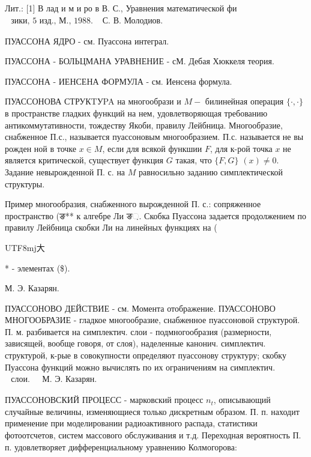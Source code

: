 \documentclass[10pt]{article}
\begin{document}
Лит.: [1] В лад и м и ро в В. С., Уравнения математической фи$\begin{array}{ll}\text { зики, } 5 \text { изд., М., } 1988 . & \text { С. В. Молодиов. }\end{array}$



ПУАССОНА ЯДРО - см. Пуассона интеграл.



ПУАССОНА - БОЛЬЦМАНА УРАВНЕНИЕ - сМ. Дебая Хюккеля теория.



ПУАССОНА - ИЕНСЕНА ФОРМУЛА - см. Иенсена формула.



ПУАССОНОВА СТРУКTУPA на многообрази и $M-$ билинейная операция $\{\cdot, \cdot\}$ в пространстве гладких функций на нем, удовлетворяющая требованию антикоммутативности, тождеству Якоби, правилу Лейбница. Многообразие, снабженное П.с., называется пуассоновым многообразием. П.с. называется не вы рожден ной в точке $x \in M$, если для всякой функшии $F$, для к-рой точка $x$ не является критической, существует функция $G$ такая, что $\{F, G\}$ $(x) \neq 0$. Задание невырожденной П. с. на $M$ равносильно заданию симплектической структуры.



Пример многообразия, снабженного вырожденной П. с.: сопряженное пространство (ङ** к алгебре Ли ङ઼. Скобка Пуассона задается продолжением по правилу Лейбница скобки Ли на линейных функциях на (\begin{CJK}{UTF8}{mj}大\end{CJK}* - элементах (\$).



М. Э. Казарян.



ПУАССОНОВО ДЕЙСТВИЕ - см. Момента отображение. ПУАССОНОВО МНОГООБРАЗИЕ - гладкое многообразие, снабженное пуассоновой структурой. П. м. разбивается на симплектич. слои - подмногообразия (размерности, зависящей, вообще говоря, от слоя), наделенные канонич. симплектич. структурой, к-рые в совокупности определяют пуассонову структуру; скобку Пуассона функций можно вычислять по их ограничениям на симплектич. $\begin{array}{ll}\text { слои. } & \text { М. Э. Казарян. }\end{array}$



ПУАССОНОВСКИЙ ПРОЦЕСС - марковский процесс $n_{t}$, описывающий случайные величины, изменяющиеся только дискретным образом. П. п. находит применение при моделировании радиоактивного распада, статистики фотоотсчетов, систем массового обслуживания и т.д. Переходная вероятность П. п. удовлетворяет дифференциальному уравнению Колмогорова:
\end{document}
